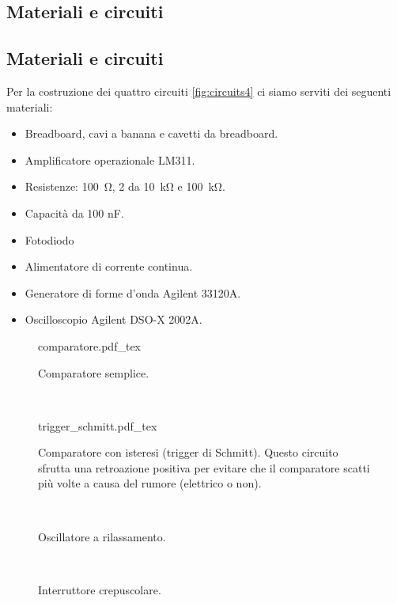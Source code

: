 \subsection{Materiali e circuiti}

\subsection{Materiali e circuiti}

Per la costruzione dei quattro circuiti \ref{fig:circuits4} ci
siamo serviti dei seguenti materiali:

\begin{itemize}
    \item{Breadboard, cavi a banana e cavetti da breadboard.}
    \item{Amplificatore operazionale LM311.}
    \item{Resistenze: \SI{100}{\ohm}, 2 da \SI{10}{\kilo\ohm} e \SI{100}{\kilo\ohm}.}
    \item{Capacità da 100 nF.}
    \item{Fotodiodo}
    \item{Alimentatore di corrente continua.}
    \item{Generatore di forme d'onda Agilent 33120A.}
    \item{Oscilloscopio Agilent DSO-X 2002A.}
\end{itemize}

\begin{figure*}[b!]
        \centering
        \begin{subfigure}[b]{0.38\textwidth}
            \def\svgwidth{\columnwidth}
            {comparatore.pdf_tex}
            \caption{Comparatore semplice.}
            \label{fig:comparatore4}
        \end{subfigure}
        ~
        \begin{subfigure}[b]{0.58\textwidth}
            \def\svgwidth{\columnwidth}
            {trigger_schmitt.pdf_tex}
            \caption{Comparatore con isteresi (trigger di Schmitt). Questo circuito
                sfrutta una retroazione positiva per evitare che il comparatore
                scatti più volte a causa del rumore (elettrico o non).}
            \label{fig:trigger_schmitt4}
        \end{subfigure}
        ~
        \begin{subfigure}[b]{0.48\textwidth}
            \def\svgwidth{\columnwidth}
            \caption{Oscillatore a rilassamento.}
            \label{fig:oscillatore4}
        \end{subfigure}
        ~
        \begin{subfigure}[b]{0.48\textwidth}
            \centering
            \def\svgwidth{0.8\columnwidth}
            \caption{Interruttore crepuscolare.}
            \label{fig:crepuscolare4}
        \end{subfigure}

        \caption{Circuiti costruiti durante l'esperienza}
        \label{fig:circuits4}
\end{figure*}
